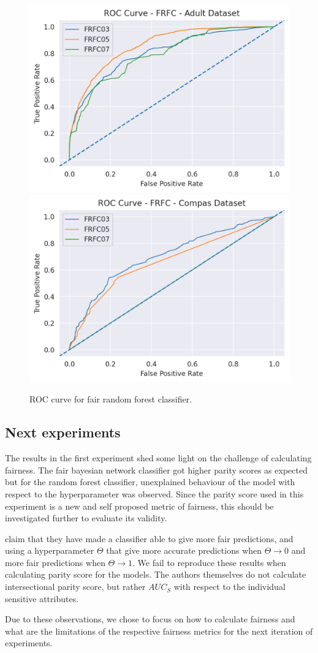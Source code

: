 \begin{figure}
    \centering
    \includegraphics[width=0.49\linewidth]{figures/adult_frfc_roc.png}
    \includegraphics[width=0.49\linewidth]{figures/compas_frfc_roc.png}
    \caption{ROC curve for fair random forest classifier.}
    \label{fig:exp1FRFCROC}
\end{figure}

\subsection{Next experiments}

The results in the first experiment shed some light on the challenge of calculating fairness. The fair bayesian network classifier got higher parity scores as expected but for the random forest classifier, unexplained behaviour of the model with respect to the hyperparameter was observed. Since the parity score used in this experiment is a new and self proposed metric of fairness, this should be investigated further to evaluate its validity.

\citet{Antonio:2021:arXiv} claim that they have made a classifier able to give more fair predictions, and using a hyperparameter $\Theta$ that give more accurate predictions when $\Theta \rightarrow 0$ and more fair predictions when $\Theta \rightarrow 1$. We fail to reproduce these results when calculating parity score for the models. The authors themselves do not calculate intersectional parity score, but rather $AUC_S$ with respect to the individual sensitive attributes.

Due to these observations, we chose to focus on how to calculate fairness and what are the limitations of the respective fairness metrics for the next iteration of experiments.

